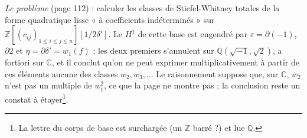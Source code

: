 \documentclass[11pt,a4paper]{article}
\begin{document}
\emph{Le problème} (page 112) : calculer les classes de Stiefel-Whitney totales de
la forme quadratique lisse « à coefficients indéterminés » sur $\mathbb{Z}[(c_{ij})_{1
\leqslant i \leqslant j \leqslant n}][1/2\delta']$. Le $H^1$ de cette base est
engendré par $\varepsilon = \partial(-1)$, $\partial 2$ et $\eta = \partial\delta' =
w_1(f)$ ; les deux premiers s'annulent sur $\mathbb{Q}(\sqrt{-1}, \sqrt 2)$, a
fortiori sur $\mathbb{C}$, et il conclut qu'on ne peut exprimer
multiplicativement à partir de ces éléments aucune des classes $w_2, w_3,
\ldots$ Le raisonnement suppose que, sur $\mathbb{C}$, $w_2$ n'est pas un
multiple de $w_1^2$, ce que la page ne montre pas ; la conclusion reste un
constat à étayer\footnote{La lettre du corps de base est surchargée (un
$\mathbb{Z}$ barré ?) et lue $\mathbb{Q}$.}.
\end{document}
